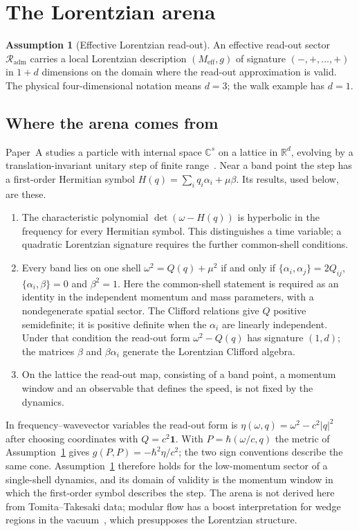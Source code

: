 \documentclass[12pt,a4paper]{article}
\theoremstyle{definition}
\newtheorem{assumption}[theorem]{Assumption}
\theoremstyle{remark}
\newcommand{\Meff}{M_{\mathrm{eff}}}
\newcommand{\Rout}{\mathcal{R}_{\mathrm{adm}}}
\newcommand{\tightlist}{%
  \setlength{\itemsep}{0pt}\setlength{\parskip}{0pt}}
\begin{document}
\section{The Lorentzian arena}
\label{sec:arena}

\begin{assumption}[Effective Lorentzian read-out]
\label{ass:readout}
An effective read-out sector $\Rout$ carries a local Lorentzian description $(\Meff,g)$ of signature $(-,+,\ldots,+)$ in $1+d$ dimensions on the domain where the read-out approximation is valid. The physical four-dimensional notation means $d=3$; the walk example has $d=1$.
\end{assumption}

\subsection{Where the arena comes from}

Paper~A studies a particle with internal space $\mathbb C^s$ on a lattice in $\mathbb R^d$, evolving by a translation-invariant unitary step of finite range~\cite{Liu2026QRAIFA}. Near a band point the step has a first-order Hermitian symbol $H(q)=\sum_iq_i\alpha_i+\mu\beta$. Its results, used below, are these.
\begin{enumerate}[leftmargin=*]
\tightlist
\item The characteristic polynomial $\det(\omega-H(q))$ is hyperbolic in the frequency for every Hermitian symbol. This distinguishes a time variable; a quadratic Lorentzian signature requires the further common-shell conditions.
\item Every band lies on one shell $\omega^2=Q(q)+\mu^2$ if and only if $\{\alpha_i,\alpha_j\}=2Q_{ij}$, $\{\alpha_i,\beta\}=0$ and $\beta^2=1$. Here the common-shell statement is required as an identity in the independent momentum and mass parameters, with a nondegenerate spatial sector. The Clifford relations give $Q$ positive semidefinite; it is positive definite when the $\alpha_i$ are linearly independent. Under that condition the read-out form $\omega^2-Q(q)$ has signature $(1,d)$; the matrices $\beta$ and $\beta\alpha_i$ generate the Lorentzian Clifford algebra.
\item On the lattice the read-out map, consisting of a band point, a momentum window and an observable that defines the speed, is not fixed by the dynamics.
\end{enumerate}
In frequency--wavevector variables the read-out form is $\eta(\omega,q)=\omega^2-c^2|q|^2$ after choosing coordinates with $Q=c^2\mathbf 1$. With $P=\hbar(\omega/c,q)$ the metric of Assumption~\ref{ass:readout} gives $g(P,P)=-\hbar^2\eta/c^2$; the two sign conventions describe the same cone. Assumption~\ref{ass:readout} therefore holds for the low-momentum sector of a single-shell dynamics, and its domain of validity is the momentum window in which the first-order symbol describes the step. The arena is not derived here from Tomita--Takesaki data; modular flow has a boost interpretation for wedge regions in the vacuum~\cite{BisognanoWichmann1975,BisognanoWichmann1976}, which presupposes the Lorentzian structure.
\end{document}
